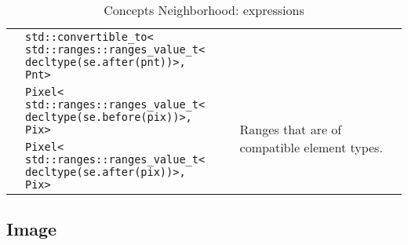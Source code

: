 \begin{table}[!htbp]
\begin{scriptsize}
\begin{tabular}{llll}
      \multicolumn{1}{c|}{}                              & \makecell[l]{\texttt{std::convertible\_to<}                                                                                                              \\\texttt{std::ranges::ranges\_value\_t<}\\\texttt{decltype(se.after(pnt))>, Pnt>}}  &                                               &                                                                    \\
      \multicolumn{1}{c|}{}                              & \makecell[l]{\texttt{Pixel<}                                                                                                                             \\\texttt{std::ranges::ranges\_value\_t<}\\\texttt{decltype(se.before(pix))>, Pix>}}                 &                                               & \multirow{2}{*}{Ranges that are of compatible element types.}      \\
      \multicolumn{1}{c|}{}                              & \makecell[l]{\texttt{Pixel<}                                                                                                                             \\\texttt{std::ranges::ranges\_value\_t<}\\\texttt{decltype(se.after(pix))>, Pix>}}                  &                                               &                                                                    \\
      \cline{1-4}
    \end{tabular}
    \smallskip

    \caption{Concepts Neighborhood: expressions}
  \end{scriptsize}
  \label{concept.tables.nbh.expressions}
\end{table}

\subsection{Image}
\label{image_and_algorithms_taxonomy.concepts.subsec.image}


